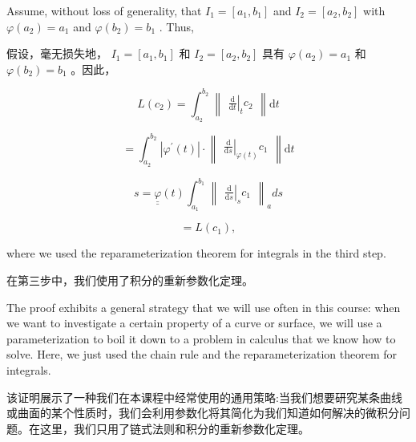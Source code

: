 Assume, without loss of generality, that \({I}_{1} = \left\lbrack  {{a}_{1},{b}_{1}}\right\rbrack\) and \({I}_{2} = \left\lbrack  {{a}_{2},{b}_{2}}\right\rbrack\) with \(\varphi \left( {a}_{2}\right)  = {a}_{1}\) and \(\varphi \left( {b}_{2}\right)  = {b}_{1}\) . Thus,

\begin{tcolorbox}
假设，毫无损失地， \({I}_{1} = \left\lbrack  {{a}_{1},{b}_{1}}\right\rbrack\) 和 \({I}_{2} = \left\lbrack  {{a}_{2},{b}_{2}}\right\rbrack\) 具有 \(\varphi \left( {a}_{2}\right)  = {a}_{1}\) 和 \(\varphi \left( {b}_{2}\right)  = {b}_{1}\) 。因此，
\end{tcolorbox}

\[
L\left( {c}_{2}\right)  = {\int }_{{a}_{2}}^{{b}_{2}}\begin{Vmatrix}{{\left. \frac{\mathrm{d}}{\mathrm{d}t}\right| }_{t}{c}_{2}}\end{Vmatrix}\mathrm{d}t
\]

\[
= {\int }_{{a}_{2}}^{{b}_{2}}\left| {{\varphi }^{\prime }\left( t\right) }\right|  \cdot  \begin{Vmatrix}{{\left. \frac{\mathrm{d}}{\mathrm{d}s}\right| }_{\varphi \left( t\right) }{c}_{1}}\end{Vmatrix}\mathrm{d}t
\]

\[
s = \underline{\underline{\varphi }}\left( t\right) {\int }_{{a}_{1}}^{{b}_{1}}{\begin{Vmatrix}{\left. \frac{\mathrm{d}}{\mathrm{d}s}\right| }_{s}{c}_{1}\end{Vmatrix}}_{a}{ds}
\]

\[
= L\left( {c}_{1}\right) ,
\]

where we used the reparameterization theorem for integrals in the third step.

\begin{tcolorbox}
在第三步中，我们使用了积分的重新参数化定理。
\end{tcolorbox}

The proof exhibits a general strategy that we will use often in this course: when we want to investigate a certain property of a curve or surface, we will use a parameterization to boil it down to a problem in calculus that we know how to solve. Here, we just used the chain rule and the reparameterization theorem for integrals.

\begin{tcolorbox}
该证明展示了一种我们在本课程中经常使用的通用策略:当我们想要研究某条曲线或曲面的某个性质时，我们会利用参数化将其简化为我们知道如何解决的微积分问题。在这里，我们只用了链式法则和积分的重新参数化定理。
\end{tcolorbox}

